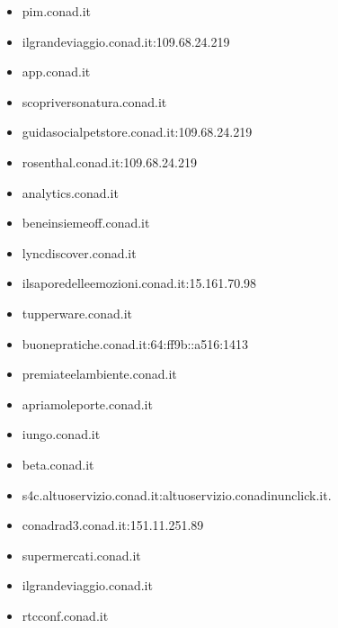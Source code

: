 \documentclass{article}
\begin{document}
\begin{itemize}
        \item pim.conad.it
    
        \item ilgrandeviaggio.conad.it:109.68.24.219
    
        \item app.conad.it
    
        \item scopriversonatura.conad.it
    
        \item guidasocialpetstore.conad.it:109.68.24.219
    
        \item rosenthal.conad.it:109.68.24.219
    
        \item analytics.conad.it
    
        \item beneinsiemeoff.conad.it
    
        \item lyncdiscover.conad.it
    
        \item ilsaporedelleemozioni.conad.it:15.161.70.98
    
        \item tupperware.conad.it
    
        \item buonepratiche.conad.it:64:ff9b::a516:1413
    
        \item premiateelambiente.conad.it
    
        \item apriamoleporte.conad.it
    
        \item iungo.conad.it
    
        \item beta.conad.it
    
        \item s4c.altuoservizio.conad.it:altuoservizio.conadinunclick.it.
    
        \item conadrad3.conad.it:151.11.251.89
    
        \item supermercati.conad.it
    
        \item ilgrandeviaggio.conad.it
    
        \item rtcconf.conad.it
    

\end{itemize}
\end{document}
